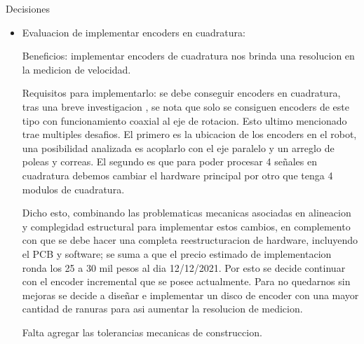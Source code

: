     {\LARGE Decisiones}

    \begin{itemize}
        \item Evaluacion de implementar encoders en cuadratura: 
        
        Beneficios: implementar encoders de cuadratura nos brinda una resolucion en la medicion de velocidad.

        Requisitos para implementarlo: se debe conseguir encoders en cuadratura, tras una breve investigacion , se nota que solo se consiguen encoders de este tipo con funcionamiento coaxial al eje de rotacion. 
        Esto ultimo mencionado trae multiples desafios.
        El primero es la ubicacion de los encoders en el robot, una posibilidad analizada es acoplarlo con el eje paralelo y un arreglo de poleas y correas.
        El segundo es que para poder procesar 4 señales en cuadratura debemos cambiar el hardware principal por otro que tenga 4 modulos de cuadratura.

        Dicho esto, combinando las problematicas mecanicas asociadas en alineacion y complegidad estructural para implementar estos cambios, en complemento con que se debe hacer una completa reestructuracion de hardware, incluyendo el PCB y software; se suma a que el precio estimado de implementacion ronda los 25 a 30 mil pesos al dia 12/12/2021.
        Por esto se decide continuar con el encoder incremental que se posee actualmente.
        Para no quedarnos sin mejoras se decide a diseñar e implementar un disco de encoder con una mayor cantidad de ranuras para asi aumentar la resolucion de medicion.

        Falta agregar las tolerancias mecanicas de construccion.
    \end{itemize}

